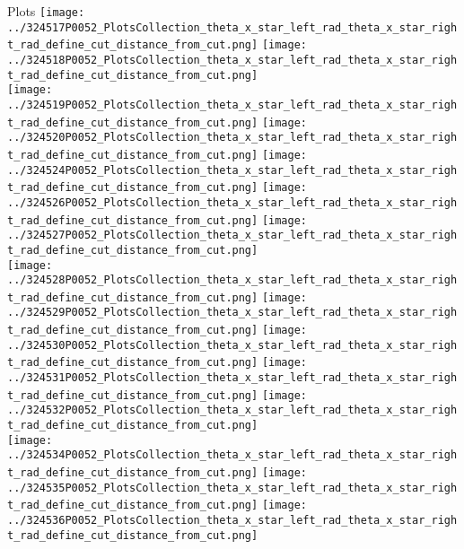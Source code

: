\documentclass{beamer}
\begin{document}
\begin{frame}
\begin{block}{Plots}
                \texttt{[image: ../324517P0052\_PlotsCollection\_theta\_x\_star\_left\_rad\_theta\_x\_star\_right\_rad\_define\_cut\_distance\_from\_cut.png]}
                \texttt{[image: ../324518P0052\_PlotsCollection\_theta\_x\_star\_left\_rad\_theta\_x\_star\_right\_rad\_define\_cut\_distance\_from\_cut.png]}\\
                \texttt{[image: ../324519P0052\_PlotsCollection\_theta\_x\_star\_left\_rad\_theta\_x\_star\_right\_rad\_define\_cut\_distance\_from\_cut.png]}
                \texttt{[image: ../324520P0052\_PlotsCollection\_theta\_x\_star\_left\_rad\_theta\_x\_star\_right\_rad\_define\_cut\_distance\_from\_cut.png]}
                \texttt{[image: ../324524P0052\_PlotsCollection\_theta\_x\_star\_left\_rad\_theta\_x\_star\_right\_rad\_define\_cut\_distance\_from\_cut.png]}
                \texttt{[image: ../324526P0052\_PlotsCollection\_theta\_x\_star\_left\_rad\_theta\_x\_star\_right\_rad\_define\_cut\_distance\_from\_cut.png]}
                \texttt{[image: ../324527P0052\_PlotsCollection\_theta\_x\_star\_left\_rad\_theta\_x\_star\_right\_rad\_define\_cut\_distance\_from\_cut.png]}\\
                \texttt{[image: ../324528P0052\_PlotsCollection\_theta\_x\_star\_left\_rad\_theta\_x\_star\_right\_rad\_define\_cut\_distance\_from\_cut.png]}
                \texttt{[image: ../324529P0052\_PlotsCollection\_theta\_x\_star\_left\_rad\_theta\_x\_star\_right\_rad\_define\_cut\_distance\_from\_cut.png]}
                \texttt{[image: ../324530P0052\_PlotsCollection\_theta\_x\_star\_left\_rad\_theta\_x\_star\_right\_rad\_define\_cut\_distance\_from\_cut.png]}
                \texttt{[image: ../324531P0052\_PlotsCollection\_theta\_x\_star\_left\_rad\_theta\_x\_star\_right\_rad\_define\_cut\_distance\_from\_cut.png]}
                \texttt{[image: ../324532P0052\_PlotsCollection\_theta\_x\_star\_left\_rad\_theta\_x\_star\_right\_rad\_define\_cut\_distance\_from\_cut.png]}\\
                \texttt{[image: ../324534P0052\_PlotsCollection\_theta\_x\_star\_left\_rad\_theta\_x\_star\_right\_rad\_define\_cut\_distance\_from\_cut.png]}
                \texttt{[image: ../324535P0052\_PlotsCollection\_theta\_x\_star\_left\_rad\_theta\_x\_star\_right\_rad\_define\_cut\_distance\_from\_cut.png]}
                \texttt{[image: ../324536P0052\_PlotsCollection\_theta\_x\_star\_left\_rad\_theta\_x\_star\_right\_rad\_define\_cut\_distance\_from\_cut.png]}

        \end{block}
\end{frame}
\end{document}
